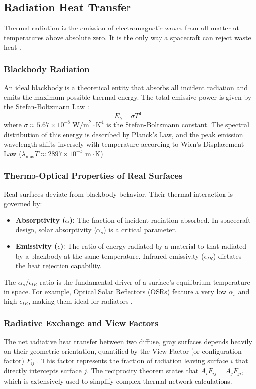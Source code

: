 \subsection{Radiation Heat Transfer}
Thermal radiation is the emission of electromagnetic waves from all matter at temperatures above absolute zero. 
It is the only way a spacecraft can reject waste heat \cite{heattransfer}. 

\subsubsection{Blackbody Radiation}
An ideal blackbody is a theoretical entity that absorbs all incident radiation and emits the maximum 
possible thermal energy. The total emissive power is given by the Stefan-Boltzmann Law \cite{heattransfer}:
\begin{equation}
    E_b = \sigma T^4
\end{equation}
where $\sigma \approx 5.67 \times 10^{-8} \text{ W/m}^2\cdot\text{K}^4$ is the Stefan-Boltzmann constant. 
The spectral distribution of this energy is described by Planck's Law, and the peak emission wavelength shifts 
inversely with temperature according to Wien's Displacement Law ($\lambda_{\text{max}} T \approx 2897 \times 10^{-3} \text{ m}\cdot\text{K}$) %

\subsubsection{Thermo-Optical Properties of Real Surfaces}
Real surfaces deviate from blackbody behavior. Their thermal interaction is governed by:
\begin{itemize}
    \item \textbf{Absorptivity ($\alpha$):} The fraction of incident radiation absorbed. In spacecraft design, solar absorptivity ($\alpha_s$) is a critical parameter.
    \item \textbf{Emissivity ($\epsilon$):} The ratio of energy radiated by a material to that radiated by a blackbody at the same temperature. Infrared emissivity ($\epsilon_{IR}$) dictates the heat rejection capability.
\end{itemize}
The $\alpha_s / \epsilon_{IR}$ ratio is the fundamental driver of a surface's equilibrium temperature in space. For example, Optical Solar Reflectors (OSRs) feature a very low $\alpha_s$ and high $\epsilon_{IR}$, making them ideal for radiators \cite{tcs_obj}.

\subsubsection{Radiative Exchange and View Factors}
The net radiative heat transfer between two diffuse, gray surfaces depends heavily on their 
geometric orientation, quantified by the View Factor (or configuration factor) $F_{ij}$ \cite{heattransfer}.
This factor represents the fraction of radiation leaving surface $i$ that directly intercepts surface $j$. 
The reciprocity theorem states that $A_i F_{ij} = A_j F_{ji}$, which is extensively used to simplify complex 
thermal network calculations.

